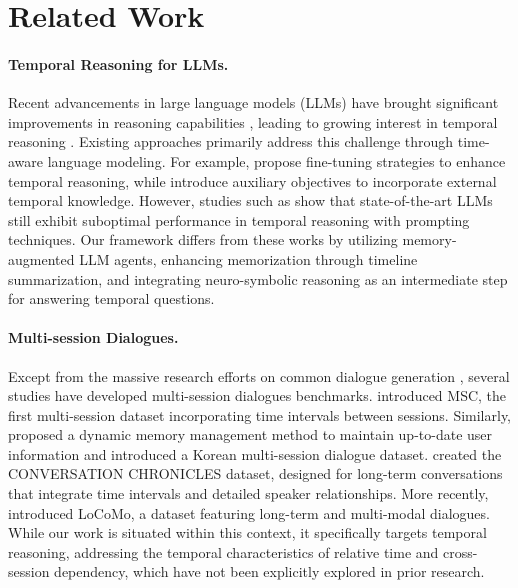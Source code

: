 \section{Related Work}

\paragraph{Temporal Reasoning for LLMs.} 
Recent advancements in large language models (LLMs) have brought significant improvements in reasoning capabilities \cite{huang2023towards}, leading to growing interest in temporal reasoning \cite{chu-etal-2024-timebench,qiu2024large}. Existing approaches primarily address this challenge through time-aware language modeling. For example, \citeauthor{kanashiro-pereira-2022-attention, tan2023towards} propose fine-tuning strategies to enhance temporal reasoning, while \citeauthor{zhou2021temporal,yang-etal-2023-upon} introduce auxiliary objectives to incorporate external temporal knowledge. However, studies such as \citeauthor{chu-etal-2024-timebench,qiu2024large} show that state-of-the-art LLMs still exhibit suboptimal performance in temporal reasoning with prompting techniques. Our framework differs from these works by utilizing memory-augmented LLM agents, enhancing memorization through timeline summarization, and integrating neuro-symbolic reasoning as an intermediate step for answering temporal questions.

\paragraph{Multi-session Dialogues.} 
Except from the massive research efforts on common dialogue generation \cite{ge2023should}, several studies have developed multi-session dialogues benchmarks. \citeauthor{xu-etal-2022-beyond} introduced MSC, the first multi-session dataset incorporating time intervals between sessions. Similarly, \citeauthor{bae-etal-2022-keep} proposed a dynamic memory management method to maintain up-to-date user information and introduced a Korean multi-session dialogue dataset. \citeauthor{jang2023conversation} created the CONVERSATION CHRONICLES dataset, designed for long-term conversations that integrate time intervals and detailed speaker relationships. More recently, \citeauthor{maharana-etal-2024-evaluating} introduced LoCoMo, a dataset featuring long-term and multi-modal dialogues. While our work is situated within this context, it specifically targets temporal reasoning, addressing the temporal characteristics of relative time and cross-session dependency, which have not been explicitly explored in prior research.